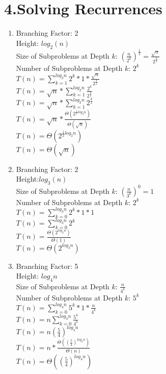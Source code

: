 \documentclass[11pt]{article}
\newenvironment{qparts}{\begin{enumerate}[{(}a{)}]}{\end{enumerate}}
\begin{document}
\section*{4.Solving Recurrences}
\begin{qparts}
\item
Branching Factor: 2\\
Height: $log_{2}(n)$ \\
Size of Subproblems at Depth $k$: $(\frac{n}{2^{k}})^\frac{1}{2} = \frac{\sqrt{n}}{2^{\frac{k}{2}}}$\\
Number of Subproblems at Depth $k$: $2^k$ \\
$T(n) = \sum_{k = 1}^{log_{2}{n}} 2^{k} * 1 * \frac{\sqrt{n}}{2^{\frac{k}{2}}}$\\
$T(n) = \sqrt{n} * \sum_{k = 1}^{log_{2}{n}} \frac{2^{k}}{2^{\frac{k}{2}}}$ \\
$T(n) = \sqrt{n} * \sum_{k = 1}^{log_{2}{n}} 2^{\frac{k}{2}}$ \\
$T(n) = \sqrt{n} * \frac{\Theta(2^{\frac{1}{2}log_{2}n})}{\Theta(\sqrt{n})}$ \\
$T(n) = \Theta(2^{\frac{1}{2}log_{2}n})$ \\
$T(n) = \Theta(\sqrt{n})$ 

\item
Branching Factor: 2 \\
Height:$log_{3}(n)$\\
Size of Subproblems at Depth $k$: $(\frac{n}{3^{k}})^{0} = 1$\\
Number of Subproblems at Depth $k$: $2^{k}$\\
$T(n) = \sum_{k=0}^{log_{3}n} 2^{k} * 1 * 1$\\
$T(n) = \sum_{k=0}^{log_{3}n} 2^{k}$ \\
$T(n) = \frac{\Theta(2^{log_{3}n})}{\Theta(1)}$ \\
$T(n) = \Theta(2^{log_{3}n})$

\item
Branching Factor: 5 \\
Height: $log_{4}n$\\
Size of Subproblems at Depth $k$: $\frac{n}{4^{k}}$ \\
Number of Subproblems at Depth $k$: $5^{k}$ \\
$T(n) = \sum_{k=0}^{log_{4}n} 5^{k} * 1 * \frac{n}{4^{k}}$\\
$T(n) = n \sum_{k=0}^{log_{3}n} \frac{5^{k}}{4^{k}}$ \\
$T(n) = n (\frac{5}{4})^{log_{4}n}$ \\
$T(n) = n * \frac{\Theta((\frac{5}{4})^{log_{4}n})}{\Theta(n)}$ \\
$T(n) = \Theta((\frac{5}{4})^{log_{4}n})$



\end{qparts}
\end{document}
